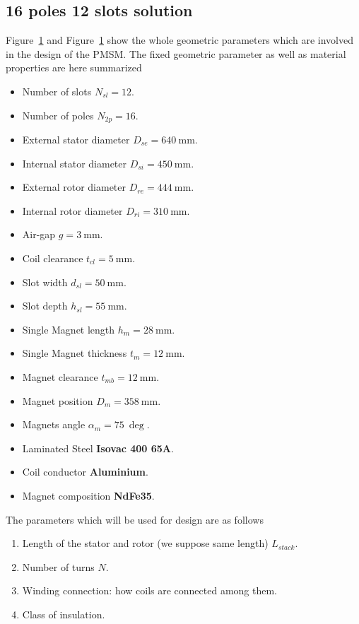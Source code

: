 \documentclass[12pt,a4paper,oneside]{book}
\begin{document}
\begin{onehalfspace}
\section{16 poles 12 slots solution}
Figure~\ref{} and Figure~\ref{} show the whole geometric parameters which are involved in the design of the PMSM. The fixed geometric parameter as well as material properties are here summarized
\begin{itemize}
	\item Number of slots $N_{sl}=12$.	
	\item Number of poles $N_{2p}=16$.
	\item External stator diameter $D_{se}=\SI{640}{\milli\meter}$.
	\item Internal stator diameter $D_{si}=\SI{450}{\milli\meter}$.
	\item External rotor diameter $D_{re}=\SI{444}{\milli\meter}$.
	\item Internal rotor diameter $D_{ri}=\SI{310}{\milli\meter}$.
	\item Air-gap $g=\SI{3}{\milli\meter}$.
	\item Coil clearance $t_{cl}=\SI{5}{\milli\meter}$.
	\item Slot width $d_{sl}=\SI{50}{\milli\meter}$.
	\item Slot depth $h_{sl}=\SI{55}{\milli\meter}$.
	\item Single Magnet length $h_{m}=\SI{28}{\milli\meter}$.
	\item Single Magnet thickness $t_{m}=\SI{12}{\milli\meter}$.
	\item Magnet clearance $t_{mb}=\SI{12}{\milli\meter}$.
	\item Magnet position $D_{m}=\SI{358}{\milli\meter}$.
	\item Magnets angle $\alpha_{m}=\SI{75}{\deg}$.
	\item Laminated Steel \textbf{Isovac 400 65A}.
	\item Coil conductor \textbf{Aluminium}.
	\item Magnet composition \textbf{NdFe35}.
\end{itemize}
The parameters which will be used for design are as follows
\begin{enumerate}
	\item Length of the stator and rotor (we suppose same length) $L_{stack}$.
	\item Number of turns $N$.
	\item Winding connection: how coils are connected among them.
	\item Class of insulation.
\end{enumerate}



\end{onehalfspace}
\end{document}
